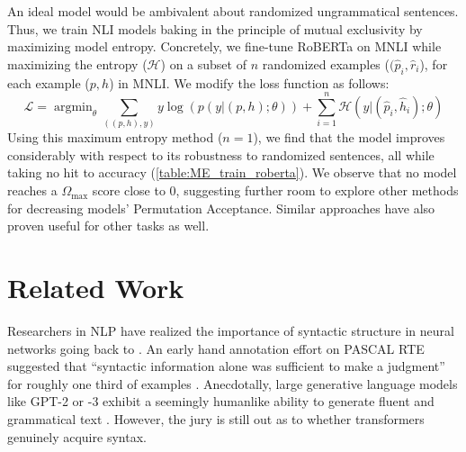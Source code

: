 \documentclass[letterpaper, 12pt]{report}
\DeclareMathOperator*{\argminB}{argmin}
\newcommand{\PermAcc}{Permutation Acceptance} %
\begin{document}

An ideal model would be ambivalent about randomized ungrammatical sentences. Thus, we train NLI models baking in the principle of mutual exclusivity \citep{gandhi2019mutual} by maximizing model entropy. Concretely, we fine-tune RoBERTa on MNLI while maximizing the entropy ($\bm{\mathcal{H}}$) on a subset of $n$ randomized examples ($(\hat{p}_i, \hat{r}_i$), for each example ($p,h$) in MNLI. We modify the loss function as follows:
\begin{dmath}
    \mathcal{L}=\argminB_{\theta}\sum_{\left((p, h),y\right)}y\log(p(y|(p,h);\theta)) + \sum_{i=1}^n \bm{\mathcal{H}}\left(y|(\hat{p}_i,\hat{h}_i);\theta\right)
\end{dmath}
Using this maximum entropy method ($n=1$), we find that the model improves considerably with respect to its robustness to randomized sentences, all while taking no hit to accuracy (\autoref{table:ME_train_roberta}). We observe that no model reaches a $\Omega_{\text{max}}$ score close to 0, suggesting further room to explore other methods for decreasing models' \PermAcc. Similar approaches have also proven useful \citep{gupta-etal-2021-bert} for other tasks as well.






\section{Related Work}
\label{sec:unli_related}

Researchers in NLP have realized the importance of syntactic structure in neural networks going back to \cite{tabor-1994-syntactic}. An early hand annotation effort on PASCAL RTE \citep{dagan-etal-2006} suggested that ``syntactic information alone was sufficient to make a judgment'' for roughly one third of examples %
\citep{vanderwende2005syntax}. %
Anecdotally, large generative language models like GPT-2 or -3 exhibit a seemingly humanlike ability to generate fluent and grammatical text \citep{goldberg2019assessing, wolf2019some}.
However, the jury is still out as to whether transformers genuinely acquire syntax.
\end{document}
